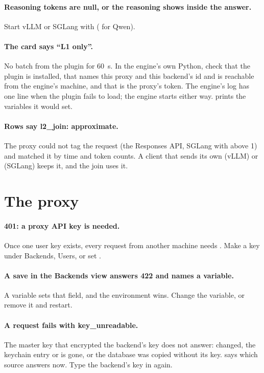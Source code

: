 \paragraph{Reasoning tokens are null, or the reasoning shows inside the answer.} Start vLLM or SGLang with  ( for Qwen).

\paragraph{The card says \enquote{L1 only}.} No batch from the plugin for 60~s. In the engine's own Python, check that the plugin is installed, that  names this proxy and this backend's id and is reachable from the engine's machine, and that  is the proxy's token. The engine's log has one line when the plugin fails to load; the engine starts either way.  prints the variables it would set.

\paragraph{Rows say l2\_join: approximate.} The proxy could not tag the request (the Responses API, SGLang with  above 1) and matched it by time and token counts. A client that sends its own  (vLLM) or  (SGLang) keeps it, and the join uses it.

\section{The proxy}

\paragraph{401: a proxy API key is needed.} Once one user key exists, every request from another machine needs . Make a key under Backends, Users, or set .

\paragraph{A save in the Backends view answers 422 and names a variable.} A  variable sets that field, and the environment wins. Change the variable, or remove it and restart.

\paragraph{A request fails with key\_unreadable.} The master key that encrypted the backend's key does not answer:  changed, the keychain entry or  is gone, or the database was copied without its key.  says which source answers now. Type the backend's key in again.

